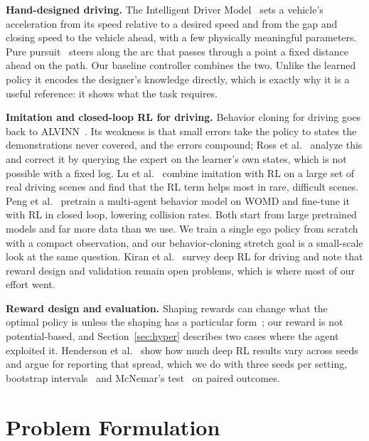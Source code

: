 \documentclass[conference]{IEEEtran}
\begin{document}
\textbf{Hand-designed driving.} The Intelligent Driver Model~\cite{treiber2000idm} sets a
vehicle's acceleration from its speed relative to a desired speed and from the gap and
closing speed to the vehicle ahead, with a few physically meaningful parameters. Pure
pursuit~\cite{coulter1992purepursuit} steers along the arc that passes through a point a
fixed distance ahead on the path. Our baseline controller combines the two. Unlike the
learned policy it encodes the designer's knowledge directly, which is exactly why it is
a useful reference: it shows what the task requires.

\textbf{Imitation and closed-loop RL for driving.} Behavior cloning for driving goes back
to ALVINN~\cite{pomerleau1989alvinn}. Its weakness is that small errors take the policy
to states the demonstrations never covered, and the errors compound; Ross et
al.~\cite{ross2011dagger} analyze this and correct it by querying the expert on the
learner's own states, which is not possible with a fixed log. Lu et
al.~\cite{lu2022imitation} combine imitation with RL on a large set of real driving
scenes and find that the RL term helps most in rare, difficult scenes. Peng et
al.~\cite{peng2024finetuning} pretrain a multi-agent behavior model on WOMD and fine-tune
it with RL in closed loop, lowering collision rates. Both start from large pretrained
models and far more data than we use. We train a single ego policy from scratch with a
compact observation, and our behavior-cloning stretch goal is a small-scale look at the
same question. Kiran et al.~\cite{kiran2022survey} survey deep RL for driving and note
that reward design and validation remain open problems, which is where most of our effort
went.

\textbf{Reward design and evaluation.} Shaping rewards can change what the optimal
policy is unless the shaping has a particular form~\cite{ng1999shaping}; our reward is
not potential-based, and Section~\ref{sec:hyper} describes two cases where the agent
exploited it. Henderson et al.~\cite{henderson2018matters} show how much deep RL
results vary across seeds and argue for reporting that spread, which we do with three
seeds per setting, bootstrap intervals~\cite{efron1993bootstrap} and McNemar's
test~\cite{mcnemar1947} on paired outcomes.

\section{Problem Formulation}
\end{document}
